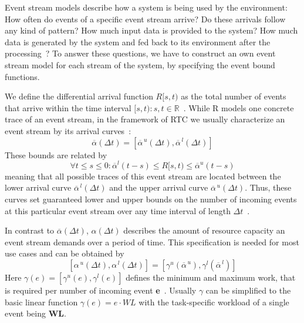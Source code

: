 \label{arrivalCurves}

Event stream models describe how a system is being used by the environment:
How often do events of a specific event stream arrive? Do these arrivals follow any kind of pattern? How much input data is provided to the system?
How much data is generated by the system and fed back to its environment after the processing~\cite{mar}?
To answer these questions, we have to construct an own event stream model for each stream of the system, by specifying the event bound functions.


We define the differential arrival function \(R[s, t)\) as the total number of events that arrive within the time interval \([s, t): s,t \in \mathbb{R}\)~\cite{cho:08}.
While R models one concrete trace of an event stream, in the framework of RTC we usually characterize an event stream by its arrival curves~\cite{cho:08}:
\[\overline{\alpha}(\Delta t) = [\overline{\alpha}^{\, u}(\Delta t), \overline{\alpha}^{\, l}(\Delta t)] \]
These bounds are related by
\[\forall t \leq s \leq 0: \overline{\alpha}^{l}(t-s) \leq R[s, t) \leq \overline{\alpha}^{u}(t-s)\]
meaning that all possible traces of this event stream are located between the lower arrival curve \(\overline{\alpha}^{\, l}(\Delta t)\) and the upper arrival curve \(\overline{\alpha}^{\, u}(\Delta t)\).
Thus, these curves set guaranteed lower and upper bounds on the number of incoming events at this particular event stream over any time interval of length \(\Delta t\)~\cite{moy}.

In contrast to \(\overline{\alpha}(\Delta t)\), \(\alpha(\Delta t)\) describes the amount of resource capacity an event stream demands over a period of time\cite{cho:08}.
This specification is needed for most use cases and can be obtained by
\[[\alpha^{\, u}(\Delta t), \alpha^{\, l}(\Delta t)] = [\gamma^{u}(\overline{\alpha}^{\, u}), \gamma^{l}(\overline{\alpha}^{\, l})]\]
Here \(\gamma(e) = [\gamma^{u}(e), \gamma^{l}(e)]\) defines the minimum and maximum work, that is required per number of incoming event \textbf{e}~\cite{mar}.
Usually \(\gamma\) can be simplified to the basic linear function \(\gamma(e) = e \cdot WL\) with the task-specific workload of a single event being \textbf{WL}\cite{wan:06}.


